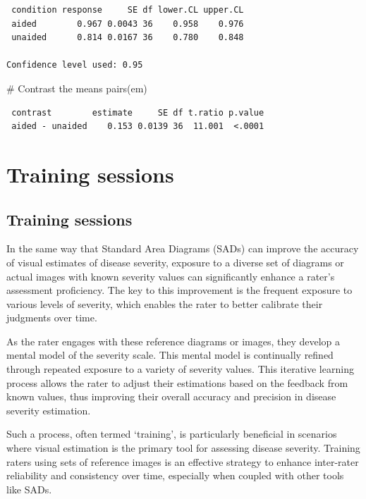 \documentclass[
  letterpaper,
  DIV=11,
  numbers=noendperiod]{scrreprt}
\newenvironment{Shaded}{\begin{snugshade}}{\end{snugshade}}
\newcommand{\CommentTok}[1]{\textcolor[rgb]{0.37,0.37,0.37}{#1}}
\newcommand{\FunctionTok}[1]{\textcolor[rgb]{0.28,0.35,0.67}{#1}}
\newcommand{\NormalTok}[1]{\textcolor[rgb]{0.00,0.23,0.31}{#1}}
\begin{document}
\begin{verbatim}
 condition response     SE df lower.CL upper.CL
 aided        0.967 0.0043 36    0.958    0.976
 unaided      0.814 0.0167 36    0.780    0.848

Confidence level used: 0.95 
\end{verbatim}

\begin{Shaded}
\begin{Highlighting}[]
\CommentTok{\# Contrast the means}
\FunctionTok{pairs}\NormalTok{(em)}
\end{Highlighting}
\end{Shaded}

\begin{verbatim}
 contrast        estimate     SE df t.ratio p.value
 aided - unaided    0.153 0.0139 36  11.001  <.0001
\end{verbatim}

\hypertarget{training-sessions}{%
\chapter{Training sessions}\label{training-sessions}}

\hypertarget{training-sessions-1}{%
\section{Training sessions}\label{training-sessions-1}}

In the same way that Standard Area Diagrams (SADs) can improve the
accuracy of visual estimates of disease severity, exposure to a diverse
set of diagrams or actual images with known severity values can
significantly enhance a rater's assessment proficiency. The key to this
improvement is the frequent exposure to various levels of severity,
which enables the rater to better calibrate their judgments over time.

As the rater engages with these reference diagrams or images, they
develop a mental model of the severity scale. This mental model is
continually refined through repeated exposure to a variety of severity
values. This iterative learning process allows the rater to adjust their
estimations based on the feedback from known values, thus improving
their overall accuracy and precision in disease severity estimation.

Such a process, often termed `training', is particularly beneficial in
scenarios where visual estimation is the primary tool for assessing
disease severity. Training raters using sets of reference images is an
effective strategy to enhance inter-rater reliability and consistency
over time, especially when coupled with other tools like SADs.
\end{document}
